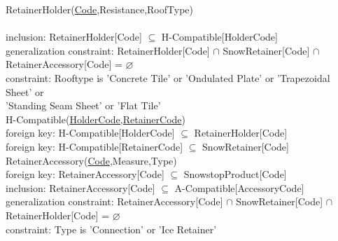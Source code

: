\documentclass{article}[h]
\begin{document}
{\color{ForestGreen}RetainerHolder(\underline{Code},Resistance,RoofType)}\\
{ \\
{\color{Orange}\hspace{2mm} inclusion: {\color{Magenta}RetainerHolder[Code] $\subseteq$ H-Compatible[HolderCode]}} \\
{\color{Orange}\hspace{2mm} generalization constraint: {\color{Magenta} RetainerHolder[Code] $\cap $ SnowRetainer[Code] $\cap$ RetainerAccessory[Code] = $\varnothing $}} \\ 
{\color{Orange}\hspace{2mm} constraint: {\color{Magenta}Rooftype is 'Concrete Tile' or 'Ondulated Plate' or 'Trapezoidal Sheet' or}} \\
{\color{Magenta}\hspace{19.5mm}'Standing Seam Sheet' or 'Flat Tile'}\\

{\color{ForestGreen}H-Compatible(\underline{HolderCode,RetainerCode})}\\
{\color{Orange}\hspace{2mm} foreign key: {\color{Magenta}H-Compatible[HolderCode] $\subseteq$ RetainerHolder[Code]}} \\
{\color{Orange}\hspace{2mm} foreign key: {\color{Magenta}H-Compatible[RetainerCode] $\subseteq$ SnowRetainer[Code]}} \\

{\color{ForestGreen}RetainerAccessory(\underline{Code},Measure,Type)}\\
{\color{Orange}\hspace{2mm} foreign key: {\color{Magenta}RetainerAccessory[Code] $\subseteq$ SnowstopProduct[Code]}} \\
{\color{Orange}\hspace{2mm} inclusion: {\color{Magenta}RetainerAccessory[Code] $\subseteq$ A-Compatible[AccessoryCode]}} \\
{\color{Orange}\hspace{2mm} generalization constraint: {\color{Magenta} RetainerAccessory[Code] $\cap $ SnowRetainer[Code] $\cap$ RetainerHolder[Code] = $\varnothing $}} \\ 
{\color{Orange}\hspace{2mm} constraint: {\color{Magenta}Type is 'Connection' or 'Ice Retainer'}} \\ 

}
\end{document}
